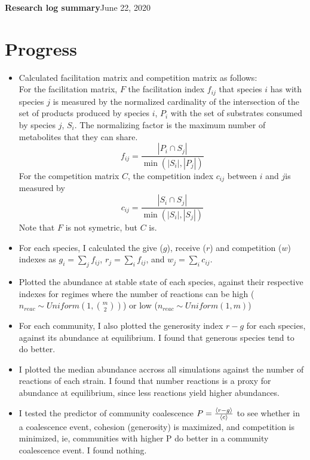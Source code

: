 \documentclass[10pt,letterpaper]{article}
\begin{document}
	
    \LARGE{\textbf{Research log summary}}\hfill\Large{June 22, 2020}

    \section*{Progress}
		\begin{itemize}
			\item Calculated facilitation matrix and competition matrix as follows:  \\
			For the facilitation matrix, $ F $ the facilitation index $ f_{ij} $ that species $ i $ has with species $ j $ is measured by the normalized cardinality of the intersection of the set of products produced by species $ i $, $ P_i $ with the set of substrates consumed by species $ j $, $ S_i $. The  normalizing factor is the maximum number of metabolites that they can share.\\
			\begin{equation}
				f_{ij} = \frac{|P_i \cap S_j|}{\min (|S_i|, |P_j|)}
			\end{equation}
			For the competition matrix $ C $, the competition index $ c_{ij} $ between $ i $ and $ j $is measured by\\
			\begin{equation}
				c_{ij} =  \frac{|S_i \cap S_j|}{\min (|S_i|, |S_j|)}
			\end{equation}
			Note that $ F $ is not symetric, but $ C $ is. 
			\item For each species, I calculated the give ($ g $), receive ($ r $)  and competition ($ w $) indexes as $ g_i = \sum_{j} f_{ij}  $,  $  r_j = \sum_{i}f_{ij} $, and $ w_j = \sum_i c_{ij}$. 
			\item Plotted the abundance at stable state of each species, against their respective indexes for regimes where the number of reactions can be high ($ n_{reac} \sim Uniform(1, {m \choose 2}) $) or low  ($ n_{reac} \sim Uniform(1, m) $) 
			\item For each community, I also plotted the generosity index $ r - g $ for each species, against its abundance at equilibrium. I found that generous species tend to do better.
			\item I plotted the median abundance accross all simulations against the number of reactions of each strain. I found that number reactions is a proxy for abundance at equilibrium, since less reactions yield higher abundances.
			\item I tested the predictor of community coalescence $ P = \frac{\braket{r - g}}{\braket{c}}$ to see whether in a coalescence event, cohesion (generosity) is maximized, and competition is minimized, ie, communities with higher P do better in a community coalescence event. I found nothing.

\end{itemize}
\end{document}
